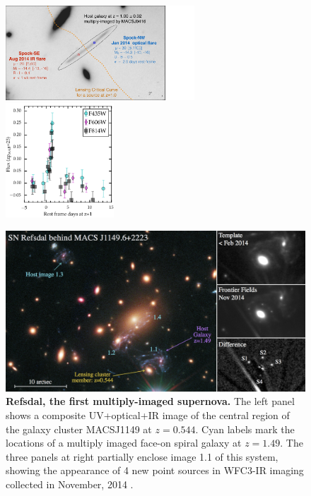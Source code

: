 \documentclass[12pt]{article}
\begin{document}
\begin{figure}
\vspace{-15mm}
\begin{center}
\includegraphics[width=0.63\textwidth]{FIG/spock_summary}
\includegraphics[width=0.36\textwidth]{FIG/spockNW_lightcurve_jan14event2}
\caption{ \label{fig:spock} %
{\bf Spock, a peculiar pair of events.}  {\it(Left)} A template
\HST\ image in the F814W band showing the locations of two transient
sources (nicknamed ``Spock-SE'' and ``Spock-NW'') that separately
appeared in adjacent images of a strongly-lensed galaxy at $z=1.0$
behind the Frontier Field cluster MACSJ0416. Lens models indicate that
a critical curve passes roughly mid-way between them, and they are
magnified by $\mu\sim20-30$ (3-4 mags).  {\it(Right)} The light curve
of the Spock-NW event was captured in high-cadence HST-ACS imaging,
and the entire episode lasted only $\sim3$ rest-frame days. 
}
\vspace{3mm}
\includegraphics[width=\textwidth]{FIG/refsdal_discovery.jpg}
 \caption{ %
  {\bf Refsdal, the first multiply-imaged supernova.}
   The left panel shows a composite UV+optical+IR image of the central
   region of the galaxy cluster MACSJ1149 at $z=0.544$.  Cyan labels
   mark the locations of a multiply imaged face-on spiral galaxy at
   $z=1.49$.  The three panels at
   right partially enclose image 1.1 of this system, showing the
   appearance of 4 new point sources in WFC3-IR imaging collected in
   November, 2014 \citep{Kelly:2015}.
\label{fig:refsdal}  }
\end{center}
\end{figure}
\end{document}
